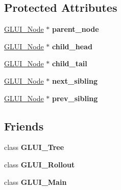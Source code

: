 \subsection*{Protected Attributes}
\begin{DoxyCompactItemize}
\item 
\hypertarget{classGLUI__Node_a308f39e8a182f499139381840418a573}{\hyperlink{classGLUI__Node}{G\-L\-U\-I\-\_\-\-Node} $\ast$ {\bfseries parent\-\_\-node}}\label{classGLUI__Node_a308f39e8a182f499139381840418a573}

\item 
\hypertarget{classGLUI__Node_ad9370e7f62e83bb720063d2439f544c2}{\hyperlink{classGLUI__Node}{G\-L\-U\-I\-\_\-\-Node} $\ast$ {\bfseries child\-\_\-head}}\label{classGLUI__Node_ad9370e7f62e83bb720063d2439f544c2}

\item 
\hypertarget{classGLUI__Node_a971d8e606c1a3442ad9b8681bdb9ed59}{\hyperlink{classGLUI__Node}{G\-L\-U\-I\-\_\-\-Node} $\ast$ {\bfseries child\-\_\-tail}}\label{classGLUI__Node_a971d8e606c1a3442ad9b8681bdb9ed59}

\item 
\hypertarget{classGLUI__Node_a2c99ef6a1290035f98871d859d05e890}{\hyperlink{classGLUI__Node}{G\-L\-U\-I\-\_\-\-Node} $\ast$ {\bfseries next\-\_\-sibling}}\label{classGLUI__Node_a2c99ef6a1290035f98871d859d05e890}

\item 
\hypertarget{classGLUI__Node_afa72f0491ca54ce8d0a0af7049de8049}{\hyperlink{classGLUI__Node}{G\-L\-U\-I\-\_\-\-Node} $\ast$ {\bfseries prev\-\_\-sibling}}\label{classGLUI__Node_afa72f0491ca54ce8d0a0af7049de8049}

\end{DoxyCompactItemize}
\subsection*{Friends}
\begin{DoxyCompactItemize}
\item 
\hypertarget{classGLUI__Node_a5cd4411266c4ef47da626d8efdf1138e}{class {\bfseries G\-L\-U\-I\-\_\-\-Tree}}\label{classGLUI__Node_a5cd4411266c4ef47da626d8efdf1138e}

\item 
\hypertarget{classGLUI__Node_a342e7f489f8666a8156fb18bd0ea0d2e}{class {\bfseries G\-L\-U\-I\-\_\-\-Rollout}}\label{classGLUI__Node_a342e7f489f8666a8156fb18bd0ea0d2e}

\item 
\hypertarget{classGLUI__Node_a97e15a1bec3e5f03f25594cb1d690fee}{class {\bfseries G\-L\-U\-I\-\_\-\-Main}}\label{classGLUI__Node_a97e15a1bec3e5f03f25594cb1d690fee}

\end{DoxyCompactItemize}


